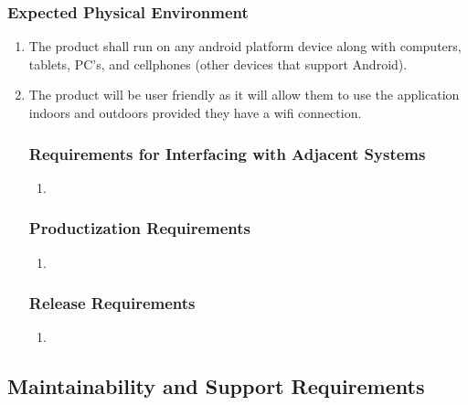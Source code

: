 \documentclass[]{article}
\begin{document}
\subsubsection{Expected Physical Environment}
\label{ssub:expected_physical_environment}
\begin{enumerate}[{OE}1. ]
	\item The product shall run on any android platform device along with computers, tablets, PC’s, and cellphones (other devices that support Android).
	\item The product will be user friendly as it will allow them to use the application indoors and outdoors provided they have a 
wifi connection.

\subsubsection{Requirements for Interfacing with Adjacent Systems}
\label{ssub:requirements_for_interfacing_with_adjacent_systems}
\begin{enumerate}[{N/A} ]
	\item
\end{enumerate}

\subsubsection{Productization Requirements}
\label{ssub:productization_requirements}
\begin{enumerate}[{N/A} ]
	\item
\end{enumerate}

\subsubsection{Release Requirements}
\label{ssub:release_requirements}
\begin{enumerate}[{N/A} ]
	\item
\end{enumerate}
\end{enumerate}


\subsection{Maintainability and Support Requirements}
\label{sub:maintainability_and_support_requirements}
\end{document}
